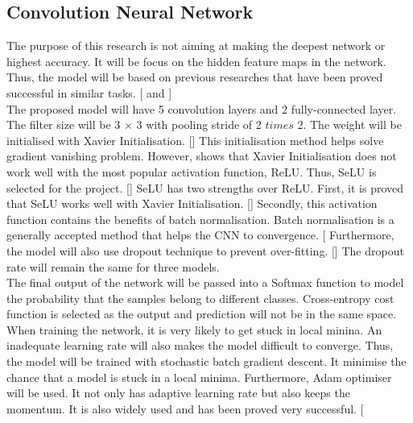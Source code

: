 \documentclass{article}
\begin{document}
\subsection{Convolution Neural Network}
 
    The purpose of this research is not aiming at making the deepest network or highest accuracy. It will be focus on the hidden feature maps in the network. Thus, the model will be based on previous researches that have been proved successful in similar tasks. {[\cite{choi2016explaining} and \cite{choi2015auralisation}]}\\
    The proposed model will have 5 convolution layers and 2 fully-connected layer. The filter size will be 3 $\times$ 3 with pooling stride of 2 $times$ 2. The weight will be initialised with Xavier Initialisation.  {[\citep{glorot2010understanding}]} This initialisation method helps solve gradient vanishing problem. However, \cite{kumar2017weight} shows that Xavier Initialisation does not work well with the most popular activation function, ReLU. Thus, SeLU is selected for the project. {[\citep{klambauer2017self}]} SeLU has two strengths over ReLU. First, it is proved that SeLU works well with Xavier Initialisation. {[\citep{jiang2017effective}]} Secondly, this activation function contains the benefits of batch normalisation. Batch normalisation is a generally accepted method that helps the CNN to convergence. {[\citep{ioffe2015batch}} Furthermore, the model will also use dropout technique to prevent over-fitting. {[\citep{srivastava2014dropout}]} The dropout rate will remain the same for three models.\\
    The final output of the network will be passed into a Softmax function to model the probability that the samples belong to different classes. Cross-entropy cost function is selected as the output and prediction will not be in the same space. When training the network, it is very likely to get stuck in local minina. An inadequate learning rate will also makes the model difficult to converge. Thus, the model will be trained with stochastic batch gradient descent. It minimise the chance that a model is stuck in a local minima. Furthermore, Adam optimiser will be used. It not only has adaptive learning rate but also keeps the momentum. It is also widely used and has been proved very successful. {[\citep{kingma2014adam}}
   
\end{document}
